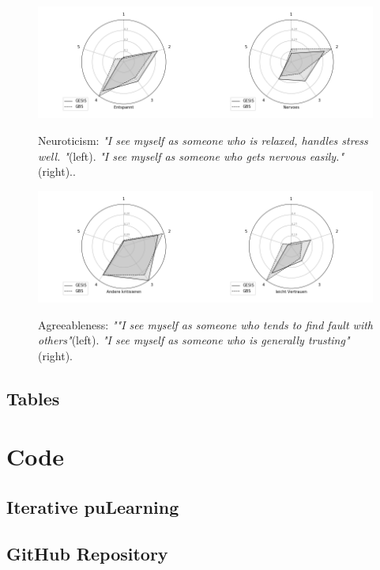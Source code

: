 \begin{appendices}
                \begin{figure}[ht]
                \begin{center}
                   \includegraphics[scale=0.55,angle=0]{fig/Neuroticismfigure}
	         \label{Neuroticism}
	         \caption{Neuroticism: \textit{"I see myself as someone who is relaxed, handles stress well. "}(left). \textit{"I see myself as someone who gets nervous easily."}(right)..}
                \end{center}
                \end{figure}

\begin{figure}[ht]
\begin{center}
\includegraphics[scale=0.75,angle=0]{fig/Agreeablenessfigure}
\label{Agreeableness}
\caption{Agreeableness: \textit{""I see myself as someone who tends to find fault with others"}(left). \textit{"I see myself as someone who is generally trusting"}(right).}
\end{center}
\end{figure}

\section{Tables}

\chapter{Code}

\section{Iterative puLearning}

\section{GitHub Repository}

\end{appendices}